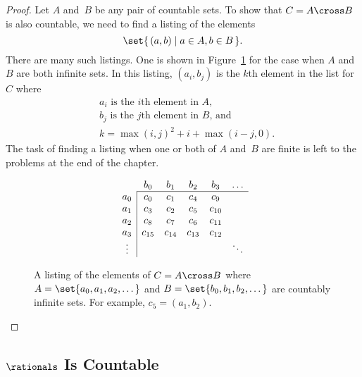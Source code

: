 \begin{proof}
Let $A$ and~$B$ be any pair of countable sets.  To show that $C = A
\cross B$ is also countable, we need to find a listing of the elements
\begin{equation*}
    \set{\, (a, b) \mid a \in A, b \in B \,}.
\end{equation*}
There are many such listings.  One is shown in Figure~\ref{fig:13D6}
for the case when $A$ and~$B$ are both infinite sets.  In this
listing, $(a_i, b_j)$ is the $k$th element in the list for~$C$ where
\begin{align*}
    & \text{$a_i$ is the $i$th element in~$A$,} \\
    & \text{$b_j$ is the $j$th element in~$B$, and} \\
    & k = \max(i,j)^2 + i + \max(i - j, 0).
\end{align*}
The task of finding a listing when one or both of $A$ and~$B$ are
finite is left to the problems at the end of the chapter.

\begin{figure}

\begin{equation*}
\begin{array}{c|ccccc}
\multicolumn{1}{c}{} & b_0    & b_1       & b_2       & b_3    & \dots \\
\cline{2-6}
a_0    & c_0    & c_1       & c_4       & c_9    \\
a_1    & c_3    & c_2       & c_5       & c_{10} \\
a_2    & c_8    & c_7       & c_6       & c_{11} \\
a_3    & c_{15} & c_{14}    & c_{13}    & c_{12} \\
\vdots &        &           &           &       & \ddots
\end{array}
\end{equation*}

\caption{A listing of the elements of $C = A \cross B$ where $A =
  \set{a_0, a_1, a_2, \dots}$ and $B = \set{b_0, b_1, b_2, \dots}$ are
  countably infinite sets.  For example, $c_5 = (a_1, b_2)$.}

\label{fig:13D6}

\end{figure}

\end{proof}

\subsection{$\rationals$ Is Countable}

